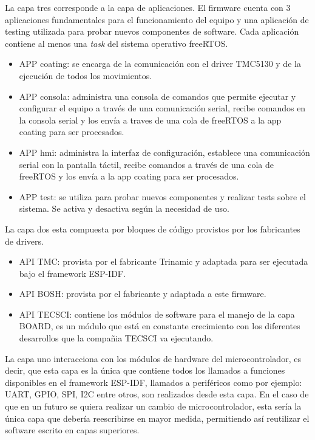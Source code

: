 La capa tres corresponde a la capa de aplicaciones. El firmware cuenta con 3 aplicaciones fundamentales para el funcionamiento del equipo y una aplicación de testing utilizada para probar nuevos componentes de software. Cada aplicación contiene al menos una \textit{task} del sistema operativo freeRTOS.

\begin{itemize}

\item APP coating: se encarga de la comunicación con el driver TMC5130 y de la ejecución de todos los movimientos.
\item APP consola: administra una consola de comandos que permite ejecutar y configurar el equipo a través de una comunicación serial, recibe comandos en la consola serial y los envía a traves de una cola de freeRTOS a la app coating para ser procesados.
\item APP hmi: administra la interfaz de configuración, establece una comunicación serial con la pantalla táctil, recibe comandos a través de una cola de freeRTOS y los envía a la app coating para ser procesados.
\item APP test: se utiliza para probar nuevos componentes y realizar tests sobre el sistema. Se activa y desactiva según la necesidad de uso.

\end{itemize}

La capa dos esta compuesta por bloques de código provistos por los fabricantes de drivers.
\begin{itemize}
\item API TMC: provista por el fabricante Trinamic y adaptada para ser ejecutada bajo el framework ESP-IDF.
\item API BOSH: provista por el fabricante y adaptada a este firmware.
\item API TECSCI: contiene los módulos de software para el manejo de la capa BOARD, es un módulo que está en constante crecimiento con los diferentes desarrollos que la compañia TECSCI va ejecutando.
\end{itemize}

La capa uno interacciona con los módulos de hardware del microcontrolador, es decir, que esta capa es la única que contiene todos los llamados a funciones disponibles en el framework ESP-IDF, llamados a periféricos como por ejemplo: UART, GPIO, SPI, I2C entre otros, son realizados desde esta capa. En el caso de que en un futuro se quiera realizar un cambio de microcontrolador, esta sería la única capa que debería reescribirse en mayor medida, permitiendo así reutilizar el software escrito en capas superiores.

